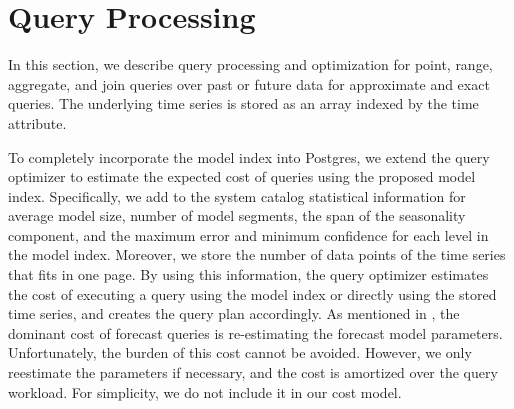 \documentclass[10pt,conference,letterpaper]{IEEEtran}
\begin{document}

\section{Query Processing}%
\label{sec:online}
In this section, we describe query processing and optimization for point, range, aggregate, and join queries over past or future data for approximate and exact queries.
The underlying time series is stored as an array indexed by the time attribute.

To completely incorporate the model index into Postgres, we extend the query optimizer to estimate the expected cost of queries using the proposed model index.  Specifically, we add to the system catalog statistical information for average model size, number of model segments, the span of the seasonality component, 
and the maximum error and minimum confidence for each level in the model index. Moreover, we store  the number of data points of the time series that fits in one page.
By using this information, the query optimizer estimates the cost of executing a query using the model index or directly using the stored time series,
and creates the query plan accordingly.
As mentioned in \cite{ArimaDB}, the dominant cost of forecast queries is re-estimating the forecast model parameters. Unfortunately, the burden of this cost cannot be avoided. 
However, we only reestimate the parameters if necessary\cite{FRL12}, and the cost is amortized over the query workload. For simplicity, we do not include it in our cost model.
\end{document}

